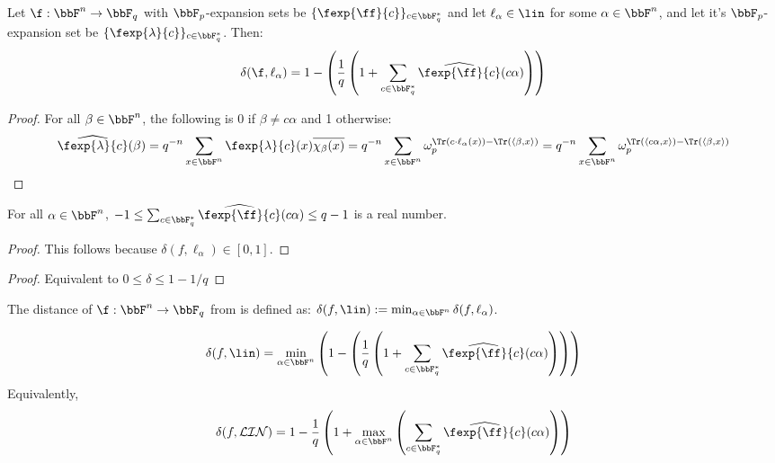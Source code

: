 \begin{claim}
Let $\f:\bbF^n\rightarrow\bbF_q$ with $\bbF_p$-expansion sets be $\{\fexp{\ff}{c}\}_{c\in\bbF_q^{*}}$ and let $\ell_{\alpha}\in\lin$ for some $\alpha\in\bbF^n$, and let it's $\bbF_p$-expansion set be $\{\fexp{\lambda}{c}\}_{c\in\bbF_q^{*}}$. Then:
$$
\delta(\f,\ell_{\alpha}) = 1-\left(\frac{1}{q}\left(1+\sum_{c\in\bbF_q^{*}}\widehat{\fexp{\ff}{c}}(c\alpha)\right)\right)  
$$
\end{claim}
\begin{proof} For all $\beta\in\bbF^n$, the following is 0 if $\beta \ne c\alpha$ and 1 otherwise:
$$\widehat{\fexp{\lambda}{c}}(\beta)=q^{-n}\sum_{x\in\bbF^n}\fexp{\lambda}{c}(x)\overline{\chi_{\beta}(x) }= q^{-n}\sum_{x\in\bbF^n}\omega_p^{\Tr(c\cdot \ell_\alpha(x)) - \Tr(\langle \beta, x\rangle) }=q^{-n}\sum_{x\in\bbF^n}\omega_p^{\Tr(\langle c\alpha, x\rangle) - \Tr(\langle \beta, x\rangle) }$$ 
\end{proof}

\begin{corollary}\label{bound for sum of expansion q}For all $\alpha\in \bbF^n$, 
$-1\le \sum_{c\in\bbF_q^{*}}\widehat{\fexp{\ff}{c}}(c\alpha)\le q-1$ is a real number.
\end{corollary}
\begin{proof}
This follows because $\delta(f,\ell_{\alpha})\in[0,1]$.
\end{proof}

\begin{proof}
    Equivalent to $0\le\delta\le 1-1/q$
\end{proof}

\begin{definition}
The distance of $\f:\bbF^n\rightarrow\bbF_q$ from \lin is defined as:  $\delta(f,\lin) :=\min_{\alpha\in\bbF^n}\delta(f,\ell_\alpha)$.
\end{definition}

\begin{corollary}\label{distance from linear}
\[
\delta(f,\lin) = \min_{\alpha\in\bbF^n}\left(1-\left(\frac{1}{q}\left(1+\sum_{c\in\bbF_q^{*}}\widehat{\fexp{\ff}{c}}(c\alpha)\right)\right) \right)
\]
Equivalently,
$$\delta(f, \mathcal{LIN}) = 1- \frac{1}{q}\left(1+ \max_{\alpha\in\bbF^n}\left(\sum_{c\in\bbF_q^{*}}\widehat{\fexp{\ff}{c}}(c\alpha)\right)\right)$$
\end{corollary}




